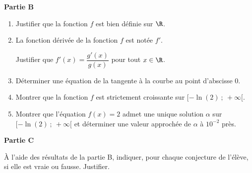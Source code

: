 \medskip

\textbf{Partie B}

\medskip

\begin{enumerate}
\item Justifier que la fonction $f$ est bien définie sur $\R$.
\item La fonction dérivée de la fonction $f$ est notée $f'$.

Justifier que $f'(x) = \dfrac{g'(x)}{g(x)}$ pour tout $x \in \R$.
\item Déterminer une équation de la tangente à la courbe au point d'abscisse $0$.
\item Montrer que la fonction $f$ est strictement croissante sur $[-\ln (2)~;~ +\infty[$.
\item Montrer que l'équation $f(x) = 2$ admet une unique solution $\alpha$ sur $[-\ln (2)~;~ +\infty[$ et déterminer une valeur approchée de $\alpha$ à $10^{-2}$ près.
\end{enumerate}

\medskip

\textbf{Partie C}

\medskip

À l'aide des résultats de la partie B, indiquer, pour chaque conjecture de l'élève, si elle est vraie ou fausse. Justifier.

\medskip
